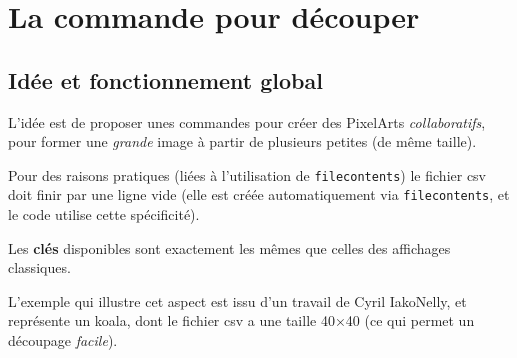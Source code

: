 \documentclass{article}
\newcommand\Cle[1]{{\bfseries\sffamily\textlangle #1\textrangle}}
\begin{document}
\newpage

\section{La commande pour découper}

\subsection{Idée et fonctionnement global}

L'idée est de proposer unes commandes pour créer des PixelArts \textit{collaboratifs}, pour former une \textit{grande} image à partir de plusieurs petites (de même taille).

\smallskip

{\footnotesize\faBomb} Pour des raisons pratiques (liées à l'utilisation de \texttt{filecontents}) le fichier \textsf{csv} doit finir par une ligne vide (elle est créée automatiquement via \texttt{filecontents}, et le code utilise cette spécificité).

\smallskip

Les \Cle{clés} disponibles sont exactement les mêmes que celles des affichages classiques.

\smallskip

L'exemple qui illustre cet aspect est issu d'un travail de Cyril IakoNelly, et représente un koala, dont le fichier \textsf{csv} a une taille 40×40 (ce qui permet un découpage \textit{facile}).
\end{document}
